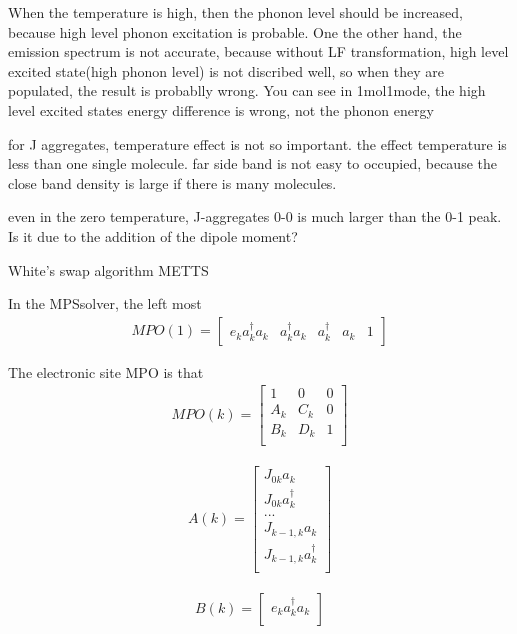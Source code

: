 \documentclass[a4paper,11pt]{ctexart}
\begin{document}
When the temperature is high, then the phonon level should be increased, because
high level phonon excitation is probable. One the other hand, the emission
spectrum is not accurate, because without LF transformation, high level excited
state(high phonon level) is not discribed well, so when they are populated, the
result is probablly wrong. You can see in 1mol1mode, the high level excited
states energy difference is wrong, not the phonon energy


for J aggregates, temperature effect is not so important. the effect temperature
is less than one single molecule.
far side band is not easy to occupied, because the close band density is large
if there is many molecules.

even in the zero temperature, J-aggregates 0-0 is much larger than the 0-1 peak.
Is it due to the addition of the dipole moment?

White's swap algorithm METTS

In the MPSsolver, the left most
\begin{gather}
MPO(1) = 
\begin{bmatrix}
    e_k a^\dagger_k a_k &  a^\dagger_k a_k & a^\dagger_k & a_k & 1 
\end{bmatrix}
\end{gather}

The electronic site MPO is that
\begin{gather}
MPO(k) = 
\begin{bmatrix}
    1 & 0 & 0  \\
    A_k & C_k & 0  \\
    B_k & D_k & 1  \\
\end{bmatrix}
\end{gather}

\begin{gather}
A(k) = 
\begin{bmatrix}
    J_{0k} a_k  \\
    J_{0k} a^\dagger_k \\
    ...  \\
    J_{k-1,k} a_k  \\
    J_{k-1,k} a^\dagger_k \\
\end{bmatrix}
\end{gather}

\begin{gather}
B(k) = 
\begin{bmatrix}
    e_k a^\dagger_k a_k \\
\end{bmatrix}
\end{gather}
\end{document}

